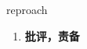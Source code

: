 
\begin{frame}
{\huge reproach}
\begin{center}
\begin{enumerate}\Large
  \item \textbf{批评，责备}
\end{enumerate}
\end{center}
\end{frame}
